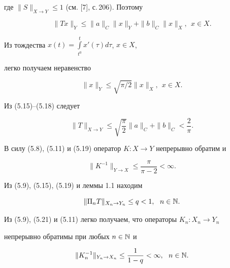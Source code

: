 где $\|S\|_{X \to Y} \le 1$ (см. [7], с.\,206). Поэтому


\begin{equation}


\|Tx\|_Y \le \|a\|_C\|x\|_Y+\|b\|_C \|x\|_X, \ \ x \in X.


\end{equation}


Из тождества $x(t)=\int\limits_{t^0}^{t}x'(\tau)d\tau$, $x\in X$,


легко получаем неравенство


\begin{equation}


\|x\|_Y\le\sqrt{\pi/2}\|x\|_X, \ \ x \in X.


\end{equation}


Из (5.15)--(5.18) следует


\begin{equation}


\|T\|_{X \to Y}\le \sqrt{\frac{\pi}{2}}\|a\|_C+\|b\|_C <\frac{2}{\pi}.


\end{equation}


В силу (5.8), (5.11) и (5.19) оператор $K:X\to Y$ непрерывно обратим и


\begin{equation}


\|K^{-1}\|_{Y\to X}\le \frac{\pi}{\pi-2}< \infty.


\end{equation}





Из (5.9), (5.15), (5.19) и леммы 1.1 находим


\begin{equation}


\|\Pi_nT\|_{X_n\to Y_n}\le q<1,\ \ n\in \Bbb N.


\end{equation}


Из (5.9), (5.21) и (5.11) легко получаем, что операторы $K_n:X_n\to Y_n$


непрерывно обратимы при любых $n\in \Bbb N$ и


\begin{equation}


\|K_n^{-1}\|_{Y_n\to X_n}\le \frac{1}{1-q}< \infty, \ \ n\in \Bbb N.


\end{equation}





